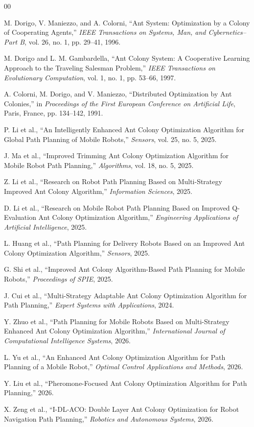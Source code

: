 \documentclass[conference]{IEEEtran}
\begin{document}
\begin{thebibliography}{00}

M. Dorigo, V. Maniezzo, and A. Colorni,
``Ant System: Optimization by a Colony of Cooperating Agents,''
\textit{IEEE Transactions on Systems, Man, and Cybernetics--Part B},
vol. 26, no. 1, pp. 29--41, 1996.

M. Dorigo and L. M. Gambardella,
``Ant Colony System: A Cooperative Learning Approach to the Traveling Salesman Problem,''
\textit{IEEE Transactions on Evolutionary Computation},
vol. 1, no. 1, pp. 53--66, 1997.

A. Colorni, M. Dorigo, and V. Maniezzo,
``Distributed Optimization by Ant Colonies,''
in \textit{Proceedings of the First European Conference on Artificial Life},
Paris, France, pp. 134--142, 1991.


P. Li et al.,
``An Intelligently Enhanced Ant Colony Optimization Algorithm for Global Path Planning of Mobile Robots,''
\textit{Sensors},
vol. 25, no. 5, 2025.

J. Ma et al.,
``Improved Trimming Ant Colony Optimization Algorithm for Mobile Robot Path Planning,''
\textit{Algorithms},
vol. 18, no. 5, 2025.

Z. Li et al.,
``Research on Robot Path Planning Based on Multi-Strategy Improved Ant Colony Algorithm,''
\textit{Information Sciences},
2025.

D. Li et al.,
``Research on Mobile Robot Path Planning Based on Improved Q-Evaluation Ant Colony Optimization Algorithm,''
\textit{Engineering Applications of Artificial Intelligence},
2025.

L. Huang et al.,
``Path Planning for Delivery Robots Based on an Improved Ant Colony Optimization Algorithm,''
\textit{Sensors},
2025.

G. Shi et al.,
``Improved Ant Colony Algorithm-Based Path Planning for Mobile Robots,''
\textit{Proceedings of SPIE},
2025.

J. Cui et al.,
``Multi-Strategy Adaptable Ant Colony Optimization Algorithm for Path Planning,''
\textit{Expert Systems with Applications},
2024.

Y. Zhuo et al.,
``Path Planning for Mobile Robots Based on Multi-Strategy Enhanced Ant Colony Optimization Algorithm,''
\textit{International Journal of Computational Intelligence Systems},
2026.

L. Yu et al.,
``An Enhanced Ant Colony Optimization Algorithm for Path Planning of a Mobile Robot,''
\textit{Optimal Control Applications and Methods},
2026.

Y. Liu et al.,
``Pheromone-Focused Ant Colony Optimization Algorithm for Path Planning,''
2026.

X. Zeng et al.,
``I-DL-ACO: Double Layer Ant Colony Optimization for Robot Navigation Path Planning,''
\textit{Robotics and Autonomous Systems},
2026.

\end{thebibliography}
\end{document}
